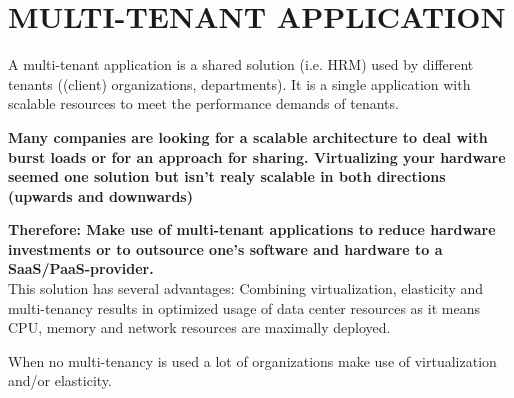 \newpage
\section*{MULTI-TENANT APPLICATION}


A multi-tenant application is a shared solution (i.e. HRM) used by different tenants ((client) organizations, departments). It is a single application with scalable resources to meet the performance demands of tenants. 

\begin{center}
  
\end{center}

\textbf{Many companies are looking for a scalable architecture to deal with burst loads or for an approach for sharing. Virtualizing your hardware seemed one solution but isn't realy scalable in both directions (upwards and downwards)}\\


\begin{center}
   
\end{center}

\textbf{Therefore: Make use of multi-tenant applications to reduce hardware investments or to outsource one's software and hardware to a SaaS/PaaS-provider.}\\

This solution has several advantages: Combining virtualization, elasticity and multi-tenancy results in optimized usage of data center
resources as it means CPU, memory and network resources are maximally deployed.


When no multi-tenancy is used a lot of organizations make use of virtualization and/or elasticity.


